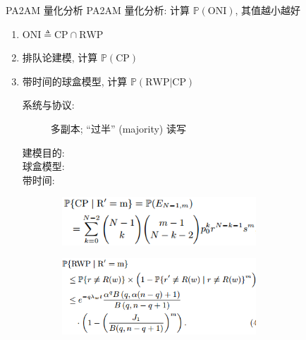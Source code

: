 \begin{frame}{PA2AM 量化分析}
  PA2AM 量化分析: 计算 $\mathbb{P}(\textrm{ONI})$, 其值越小越好

  \begin{enumerate}
	\setlength{\itemsep}{3pt}
	\item $\textrm{ONI} \triangleq \textrm{CP}  \cap \textrm{RWP}$
	\item 排队论建模, 计算 $\mathbb{P}(\textrm{CP})$ 
	\item 带时间的球盒模型, 计算 $\mathbb{P}(\textrm{RWP|CP})$
	  \pause
	  \begin{description}
		\item[系统与协议:] 多副本; ``过半'' {\small (majority)} 读写
		\item[建模目的:] 
		  \pause
		\item[球盒模型:] 
		\item[带时间:] 
	  \end{description}
  \end{enumerate}
  
  \pause

  \begin{figure}
	\begin{subfigure}{0.50\textwidth}
	  \centering
	  \includegraphics[width = 0.80\textwidth]{figures/cp.png}
	\end{subfigure}%
	\begin{subfigure}{0.50\textwidth}
	  \centering
	  \includegraphics[width = 0.80\textwidth]{figures/rwp.png}
	\end{subfigure}
  \end{figure}
\end{frame}
